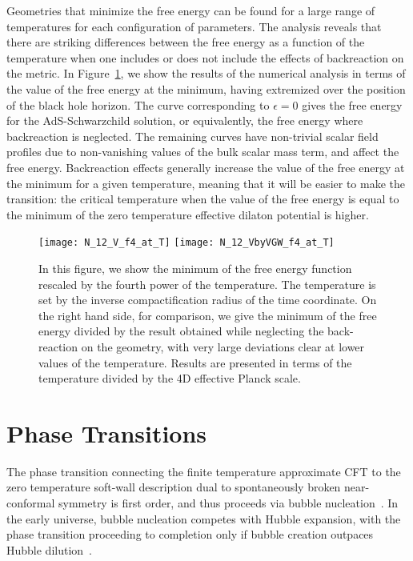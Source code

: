 \documentclass[12pt]{article}
\begin{document}
Geometries that minimize the free energy can be found for a large range of temperatures for each configuration of parameters.  The analysis reveals that there are striking differences between the free energy as a function of the temperature when one includes or does not include the effects of backreaction on the metric.  In Figure~\ref{fig:finiteTfig}, we show the results of the numerical analysis in terms of the value of the free energy at the minimum, having extremized over the position of the black hole horizon.  The curve corresponding to $\epsilon = 0$ gives the free energy for the AdS-Schwarzchild solution, or equivalently, the free energy where backreaction is neglected.  The remaining curves have non-trivial scalar field profiles due to non-vanishing values of the bulk scalar mass term, and affect the free energy.  Backreaction effects generally increase the value of the free energy at the minimum for a given temperature, meaning that it will be easier to make the transition:  the critical temperature when the value of the free energy is equal to the minimum of the zero temperature effective dilaton potential is higher.

\begin{figure}[htbp!]
	\centering
	\texttt{[image: N\_12\_V\_f4\_at\_T]}
	\texttt{[image: N\_12\_VbyVGW\_f4\_at\_T]} 
	\caption{In this figure, we show the minimum of the free energy function rescaled by the fourth power of the temperature.  The temperature is set by the inverse compactification radius of the time coordinate.  On the right hand side, for comparison, we give the minimum of the free energy divided by the result obtained while neglecting the back-reaction on the geometry, with very large deviations clear at lower values of the temperature.  Results are presented in terms of the temperature divided by the 4D effective Planck scale.}
	\label{fig:finiteTfig}
\end{figure}



\section{Phase Transitions}
\label{sec:cosmoPT}
The phase transition connecting the finite temperature approximate CFT to the zero temperature soft-wall description dual to spontaneously broken near-conformal symmetry is first order, and thus proceeds via bubble nucleation~\cite{Cline:2000xn,Randall:2006py,Nardini:2007me}.  In the early universe, bubble nucleation competes with Hubble expansion, with the phase transition proceeding to completion only if bubble creation outpaces Hubble dilution~\cite{Guth:1983pn,Hawking:1982ga}.
\end{document}
